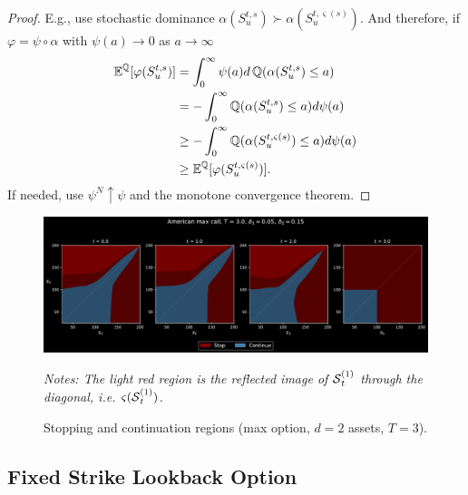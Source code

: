 \begin{proof}
E.g., use stochastic dominance $\alpha(S^{t,s}_{u}) \succ \alpha(S^{t,\varsigma(s)}_{u})$. And therefore, if $\varphi = \psi \circ \alpha$ with $\psi(a) \to 0$ as $a\to \infty$
\begin{align*}
    \operatorname{\mathbb{E}}^{\operatorname{\mathbb{Q}}}[\varphi(S^{t,s}_{u}) ] &= \int_0^{\infty} \psi(a) d\operatorname{\mathbb{Q}}(\alpha(S^{t,s}_{u}) \le a) \\ 
    &=  - \int_0^{\infty} \operatorname{\mathbb{Q}}(\alpha(S^{t,s}_{u}) \le a) d \psi(a) \\ 
    &\ge  - \int_0^{\infty} \operatorname{\mathbb{Q}}(\alpha(S^{t,\varsigma(s)}_{u}) \le a) d \psi(a) \\ 
     &\ge  \operatorname{\mathbb{E}}^{\operatorname{\mathbb{Q}}}[\varphi(S^{t,\varsigma(s)}_{u}) ].
\end{align*}
 If needed,  use $\psi^N \uparrow \psi$  and the monotone convergence theorem.  
\end{proof}

\begin{figure}
    \centering
    \caption{Stopping and continuation regions (max option, $d=2$ assets, $T=3$).}
    \includegraphics[scale = 0.42]{Figures/AsymMaxCall.pdf}
    \label{fig:asymCall}
    
    \scriptsize{
\textit{Notes: The light red region is the reflected image of $\operatorname{\mathcal{S}}_t^{(1)}$ through the diagonal, i.e. $\varsigma(\operatorname{\mathcal{S}}_t^{(1)})$.}} %
\end{figure}

\subsection{Fixed Strike  Lookback Option} \label{sec:Lkbk}


